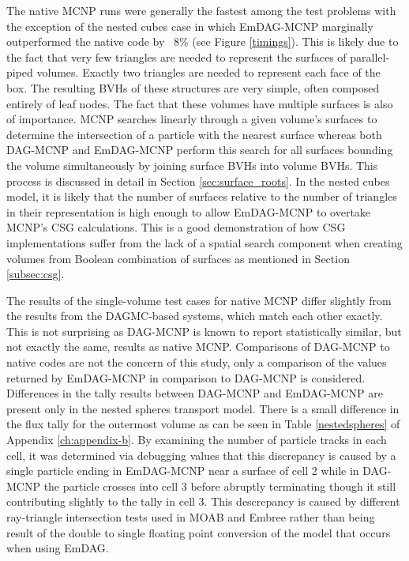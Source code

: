 The native MCNP runs were generally the fastest among the test problems with the
exception of the nested cubes case in which EmDAG-MCNP marginally outperformed
the native code by ~8\% (see Figure \ref{timings}). This is likely due to the
fact that very few triangles are needed to represent the surfaces of
parallel-piped volumes. Exactly two triangles are needed to represent each face
of the box. The resulting BVHs of these structures are very simple, often
composed entirely of leaf nodes.  The fact that these volumes have multiple
surfaces is also of importance. MCNP searches linearly through a given volume's
surfaces to determine the intersection of a particle with the nearest surface
whereas both DAG-MCNP and EmDAG-MCNP perform this search for all surfaces
bounding the volume simultaneously by joining surface BVHs into volume
BVHs. This process is discussed in detail in Section \ref{sec:surface_roots}. In
the nested cubes model, it is likely that the number of surfaces relative to the
number of triangles in their representation is high enough to allow EmDAG-MCNP
to overtake MCNP's CSG calculations. This is a good demonstration of how CSG
implementations suffer from the lack of a spatial search component when creating
volumes from Boolean combination of surfaces as mentioned in Section
\ref{subsec:csg}.

The results of the single-volume test cases for native MCNP differ slightly from
the results from the DAGMC-based systems, which match each other exactly. This
is not surprising as DAG-MCNP is known to report statistically similar, but not
exactly the same, results as native MCNP. Comparisons of DAG-MCNP to native
codes are not the concern of this study, only a comparison of the values
returned by EmDAG-MCNP in comparison to DAG-MCNP is considered. Differences in
the tally results between DAG-MCNP and EmDAG-MCNP are present only in the nested
spheres transport model. There is a small difference in the flux tally for the
outermost volume as can be seen in Table \ref{nestedspheres} of Appendix
\ref{ch:appendix-b}. By examining the number of particle tracks in each cell, it
was determined via debugging values that this discrepancy is caused by a single
particle ending in EmDAG-MCNP near a surface of cell 2 while in DAG-MCNP the
particle crosses into cell 3 before abruptly terminating though it still
contributing slightly to the tally in cell 3. This descrepancy is caused by
different ray-triangle intersection tests used in MOAB and Embree rather than
being result of the double to single floating point conversion of the model that
occurs when using EmDAG. 

